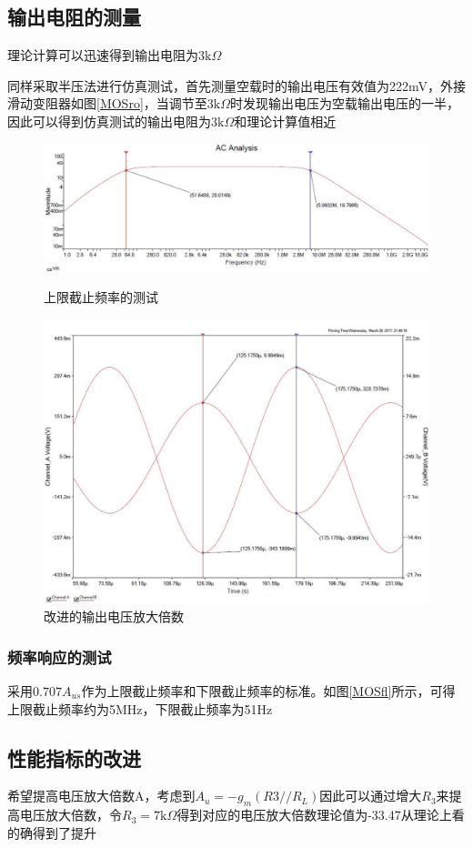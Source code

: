 \documentclass[UTF8,a4paper]{ctexart}
\begin{document}
\subsection{输出电阻的测量}
理论计算可以迅速得到输出电阻为$3\mathrm{k}\Omega$

同样采取半压法进行仿真测试，首先测量空载时的输出电压有效值为222mV，外接滑动变阻器如图\ref{MOSro}，当调节至3$\mathrm{k}\Omega$时发现输出电压为空载输出电压的一半，因此可以得到仿真测试的输出电阻为3$\mathrm{k}\Omega$和理论计算值相近
\begin{figure}
\centering
\includegraphics[width=\textwidth]{2-4fh.jpg}
\caption{上限截止频率的测试}
\label{MOSfl}
\includegraphics[width=\textwidth]{2-4AA.jpg}
\caption{改进的输出电压放大倍数}
\label{AAA}
\end{figure}

\subsubsection{频率响应的测试}
采用$0.707A_{us}$作为上限截止频率和下限截止频率的标准。如图\ref{MOSfl}所示，可得上限截止频率约为5MHz，下限截止频率为51Hz
\subsection{性能指标的改进}
希望提高电压放大倍数A，考虑到$A_u=-g_m(R3//R_L)$因此可以通过增大$R_3$来提高电压放大倍数，令$R_3=7\mathrm{k}\Omega$得到对应的电压放大倍数理论值为-33.47从理论上看的确得到了提升
\end{document}
